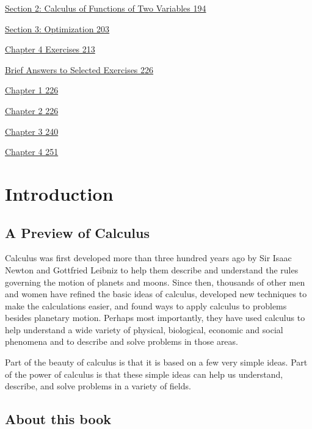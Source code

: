 \protect\hyperlink{section-2-calculus-of-functions-of-two-variables}{Section
2: Calculus of Functions of Two Variables 194}

\protect\hyperlink{section-3-optimization}{Section 3: Optimization 203}

\protect\hyperlink{chapter-4-exercises}{Chapter 4 Exercises 213}

\protect\hyperlink{brief-answers-to-selected-exercises}{Brief Answers to
Selected Exercises 226}

\protect\hyperlink{chapter-1}{Chapter 1 226}

\protect\hyperlink{chapter-2}{Chapter 2 226}

\protect\hyperlink{chapter-3}{Chapter 3 240}

\protect\hyperlink{chapter-4}{Chapter 4 251}

\protect\hypertarget{_Toc350590202}{}{}

\section{Introduction }\label{introduction}

\hypertarget{a-preview-of-calculus}{\subsection{A Preview of
Calculus}\label{a-preview-of-calculus}}

Calculus was first developed more than three hundred years ago by Sir
Isaac Newton and Gottfried Leibniz to help them describe and understand
the rules governing the motion of planets and moons. Since then,
thousands of other men and women have refined the basic ideas of
calculus, developed new techniques to make the calculations easier, and
found ways to apply calculus to problems besides planetary motion.
Perhaps most importantly, they have used calculus to help understand a
wide variety of physical, biological, economic and social phenomena and
to describe and solve problems in those areas.

Part of the beauty of calculus is that it is based on a few very simple
ideas. Part of the power of calculus is that these simple ideas can help
us understand, describe, and solve problems in a variety of fields.

\hypertarget{about-this-book}{\subsection{About this
book}\label{about-this-book}}

